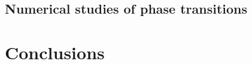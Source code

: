 \documentclass[a4paper, fontsize=11pt]{article}
\begin{document}



\subsection{Numerical studies of phase transitions}



\section{Conclusions}







\end{document}
